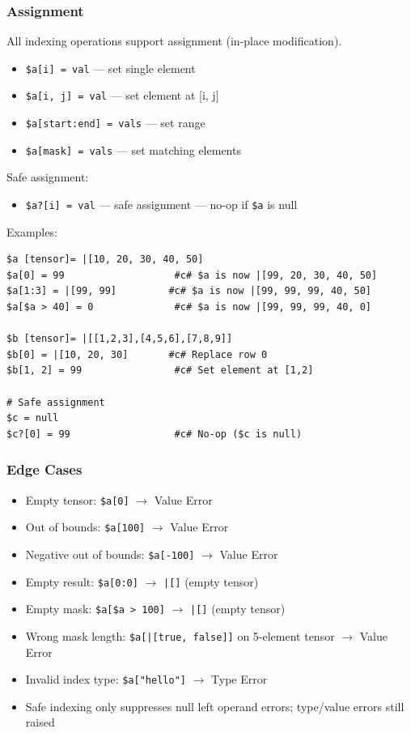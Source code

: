 \subsubsection{Assignment}
All indexing operations support assignment (in-place modification).
\begin{itemize}
\item \texttt{\$a[i] = val} --- set single element
\item \texttt{\$a[i, j] = val} --- set element at [i, j]
\item \texttt{\$a[start:end] = vals} --- set range
\item \texttt{\$a[mask] = vals} --- set matching elements
\end{itemize}

Safe assignment:
\begin{itemize}
\item \texttt{\$a?[i] = val} --- safe assignment --- no-op if \texttt{\$a} is null
\end{itemize}

Examples:
\begin{verbatim}
$a [tensor]= |[10, 20, 30, 40, 50]
$a[0] = 99                   #c# $a is now |[99, 20, 30, 40, 50]
$a[1:3] = |[99, 99]         #c# $a is now |[99, 99, 99, 40, 50]
$a[$a > 40] = 0              #c# $a is now |[99, 99, 99, 40, 0]

$b [tensor]= |[[1,2,3],[4,5,6],[7,8,9]]
$b[0] = |[10, 20, 30]       #c# Replace row 0
$b[1, 2] = 99                #c# Set element at [1,2]

# Safe assignment
$c = null
$c?[0] = 99                  #c# No-op ($c is null)
\end{verbatim}

\subsubsection{Edge Cases}
\begin{itemize}
\item Empty tensor: \texttt{\$a[0]} $\rightarrow$ Value Error
\item Out of bounds: \texttt{\$a[100]} $\rightarrow$ Value Error
\item Negative out of bounds: \texttt{\$a[-100]} $\rightarrow$ Value Error
\item Empty result: \texttt{\$a[0:0]} $\rightarrow$ \texttt{|[]} (empty tensor)
\item Empty mask: \texttt{\$a[\$a > 100]} $\rightarrow$ \texttt{|[]} (empty tensor)
\item Wrong mask length: \texttt{\$a[|[true, false]]} on 5-element tensor $\rightarrow$ Value Error
\item Invalid index type: \texttt{\$a["hello"]} $\rightarrow$ Type Error
\item Safe indexing only suppresses null left operand errors; type/value errors still raised
\end{itemize}

